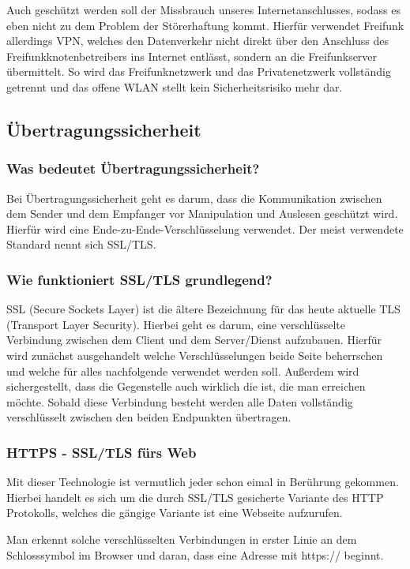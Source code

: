 Auch geschützt werden soll der Missbrauch unseres Internetanschlusses, sodass 
es eben nicht zu dem Problem der Störerhaftung kommt. Hierfür verwendet Freifunk 
allerdings VPN, welches den Datenverkehr nicht direkt über den Anschluss des 
Freifunkknotenbetreibers ins Internet entlässt, sondern an die Freifunkserver 
übermittelt. So wird das Freifunknetzwerk und das Privatenetzwerk vollständig 
getrennt und das offene WLAN stellt kein Sicherheitsrisiko mehr dar. 


\subsection{Übertragungssicherheit}
\subsubsection{Was bedeutet Übertragungssicherheit?}
Bei Übertragungssicherheit geht es darum, dass die Kommunikation zwischen dem 
Sender und dem Empfanger vor Manipulation und Auslesen geschützt wird. Hierfür 
wird eine Ende-zu-Ende-Verschlüsselung verwendet. Der meist verwendete 
Standard nennt sich SSL/TLS.

\subsubsection{Wie funktioniert SSL/TLS grundlegend?}
SSL (Secure Sockets Layer) ist die ältere Bezeichnung für das heute aktuelle 
TLS (Transport Layer Security). Hierbei geht es darum, eine verschlüsselte 
Verbindung zwischen dem Client und dem Server/Dienst aufzubauen. Hierfür wird 
zunächst ausgehandelt welche Verschlüsselungen beide Seite beherrschen und 
welche für alles nachfolgende verwendet werden soll. Außerdem wird 
sichergestellt, dass die Gegenstelle auch wirklich die ist, die man erreichen 
möchte. Sobald diese Verbindung besteht werden alle Daten vollständig 
verschlüsselt zwischen den beiden Endpunkten übertragen. 

\subsubsection{HTTPS - SSL/TLS fürs Web}
Mit dieser Technologie ist vermutlich jeder schon eimal in Berührung gekommen. 
Hierbei handelt es sich um die durch SSL/TLS gesicherte Variante des HTTP 
Protokolls, welches die gängige Variante ist eine Webseite aufzurufen. 

Man erkennt solche verschlüsselten Verbindungen in erster Linie an dem 
Schlosssymbol im Browser und daran, dass eine Adresse mit https:// beginnt.

